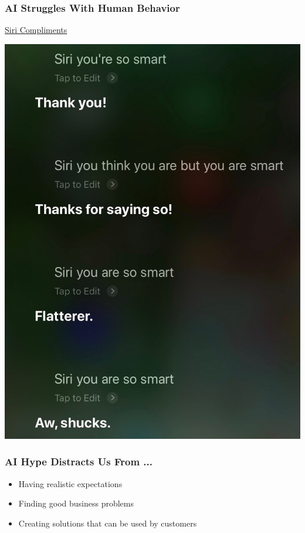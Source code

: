 \begin{frame}
\frametitle{AI Struggles With Human Behavior}
\href{run:figures/siri_smart_sarcasm.m4a}{Siri Compliments}

\begin{center}
\includegraphics[height=0.7\textheight]{figures/siri_transcript}
\end{center}
\end{frame}

\begin{frame}
\frametitle{AI Hype Distracts Us From ...}
\begin{itemize}
\item Having realistic expectations
\item Finding good business problems
\item Creating solutions that can be used by customers
\end{itemize}
\end{frame}

